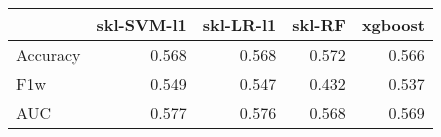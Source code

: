 \begin{tabular}{lrrrr}
\toprule
{} &  skl-SVM-l1 &  skl-LR-l1 &  skl-RF &  xgboost \\
\midrule
Accuracy &       0.568 &      0.568 &   0.572 &    0.566 \\
F1w      &       0.549 &      0.547 &   0.432 &    0.537 \\
AUC      &       0.577 &      0.576 &   0.568 &    0.569 \\
\bottomrule
\end{tabular}
